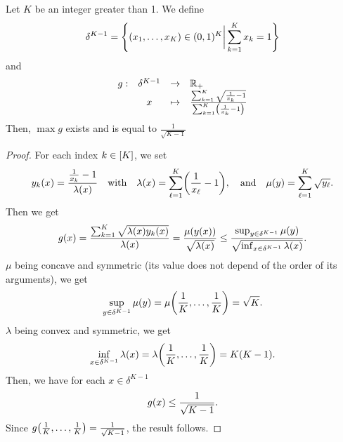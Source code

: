 \begin{lem}\label{lem:PDP:numerical-experiments:interior}
Let $K$ be an integer greater than 1.
We define
\begin{equation}
  \delta^{K-1} = \crbracket{\bracket{x_1,\ldots,x_K}\in\bracket{0,1}^K \bigg| \sum_{k=1}^K x_k = 1}
\end{equation}
and
\begin{equation}
  \begin{array}{rccl}
  g: & \delta^{K-1} & \rightarrow & \RR_+ \\
     & x & \mapsto & \frac{\sum_{k=1}^K\sqrt{\frac{1}{x_k}-1}}{\sum_{k=1}^K\bracket{\frac{1}{x_k}-1}}
  \end{array}
\end{equation}
Then, $\max g$ exists and is equal to $\frac{1}{\sqrt{K-1}}$
\end{lem}


\begin{proof}
For each index $k\in\range{K}$, we set
\begin{equation}
  y_k\bracket{x} = \frac{\frac{1}{x_k}-1}{\lambda\bracket{x}}
  \quad\mbox{with}\quad
  \lambda\bracket{x} = \sum_{\ell=1}^K\bracket{\frac{1}{x_{\ell}}-1}
  ,\quad\mbox{and}\quad 
  \mu\bracket{y} = \sum_{\ell=1}^K \sqrt{y_{\ell}}.
\end{equation}
Then we get
\begin{equation}
  g\bracket{x} = \frac{\sum_{k=1}^K\sqrt{\lambda\bracket{x}y_k\bracket{x}}}{\lambda\bracket{x}}
  = \frac{\mu\bracket{y\bracket{x}}}{\sqrt{\lambda\bracket{x}}}
  \le \frac{\sup_{y\in\delta^{K-1}}\mu\bracket{y}}{\sqrt{\inf_{x\in\delta^{K-1}}\lambda\bracket{x}}}.
\end{equation}
$\mu$ being concave and symmetric (\ie its value does not depend of the order of its arguments), we get
\begin{equation}
  \sup_{y\in\delta^{K-1}}\mu\bracket{y} = \mu\bracket{\frac{1}{K},\ldots,\frac{1}{K}} = \sqrt{K}.
\end{equation}
$\lambda$ being convex and symmetric, we get
\begin{equation}
  \inf_{x\in\delta^{K-1}}\lambda\bracket{x} = \lambda\bracket{\frac{1}{K},\ldots,\frac{1}{K}} = K\bracket{K-1}.
\end{equation}
Then, we have for each $x\in\delta^{K-1}$
\begin{equation}
  g\bracket{x} \le \frac{1}{\sqrt{K-1}}.
\end{equation}
Since $g\bracket{\frac{1}{K},\ldots,\frac{1}{K}}=\frac{1}{\sqrt{K-1}}$, the result follows.
\end{proof}



